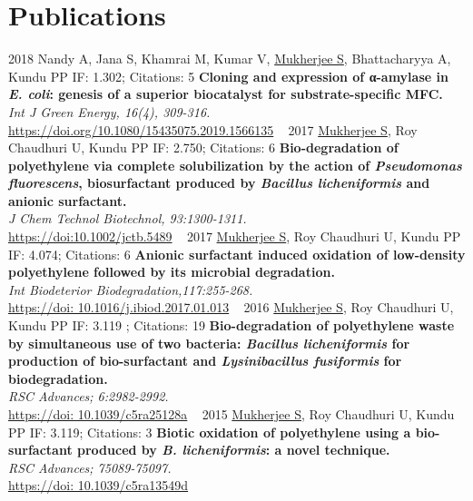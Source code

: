 \documentclass[]{friggeri-cv}
\begin{document}
\section{Publications}
\begin{entrylist}
\entry
{2018}
{Nandy A, Jana S, Khamrai M, Kumar V, \underline{Mukherjee S}, Bhattacharyya A, Kundu PP}
{IF: 1.302; Citations: 5}
{\textbf{Cloning and expression of α-amylase in \textit{E. coli}: genesis of a superior biocatalyst for substrate-specific MFC.}\\
	\emph{Int J Green Energy, 16(4), 309-316.}\\ \href{https://doi.org/10.1002/jctb.5489}{https://doi.org/10.1080/15435075.2019.1566135}}
~
\entry
	{2017}
	{\underline{Mukherjee S}, Roy Chaudhuri U, Kundu PP}
	{IF: 2.750; Citations: 6}
	{\textbf{Bio-degradation of polyethylene via complete solubilization by the action of \textit{Pseudomonas fluorescens}, biosurfactant produced by \textit{Bacillus licheniformis} and anionic surfactant.}\\
	\emph{J Chem Technol Biotechnol, 93:1300-1311.}\\ \href{https://doi.org/10.1002/jctb.5489}{https://doi:10.1002/jctb.5489}}
~
\entry	
	{2017}
	{\underline{Mukherjee S}, Roy Chaudhuri U, Kundu PP }
	{IF: 4.074; Citations: 6}
	{\textbf{Anionic surfactant induced oxidation of low-density polyethylene followed by its microbial degradation.}\\
	\emph{Int Biodeterior Biodegradation,117:255-268.}\\ \href{https://doi.org/10.1016/j.ibiod.2017.01.013}{https://doi: 10.1016/j.ibiod.2017.01.013}}
~
\entry
	{2016}
	{\underline{Mukherjee S}, Roy Chaudhuri U, Kundu PP }
	{IF: 3.119 ; Citations: 19}
	{\textbf{Bio-degradation of polyethylene waste by simultaneous use of two bacteria: \textit{Bacillus licheniformis} for production of bio-surfactant and \textit{Lysinibacillus fusiformis} for biodegradation.}\\
	\emph{RSC Advances; 6:2982-2992.}\\ \href{https://doi.org/10.1039/C5RA25128A}{https://doi: 10.1039/c5ra25128a}}
~
\entry
	{2015}
	{\underline{Mukherjee S}, Roy Chaudhuri U, Kundu PP}
	{IF: 3.119; Citations: 3}
	{\textbf{Biotic oxidation of polyethylene using a bio-surfactant produced by \textit{B. licheniformis}: a novel technique.}\\
	\emph{RSC Advances; 75089-75097.}\\ \href{https://doi.org/10.1039/C5RA13549D}{https://doi: 10.1039/c5ra13549d}}
~
\entry

\end{entrylist}
\end{document}
